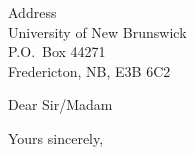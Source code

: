 \documentclass[12pt]{UBCletter}
\date{\today}
\begin{document}
\begin{letter}{%
Address\\
University of New Brunswick\\
P.O.~Box 44271\\
Fredericton, NB, E3B 6C2}

\opening{Dear Sir/Madam}



\closing{Yours sincerely,}
\end{letter}
\end{document}

